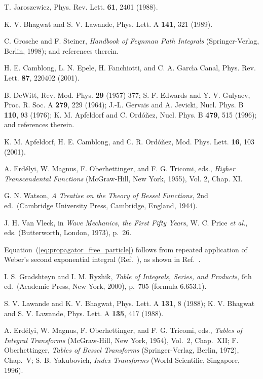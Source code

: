 \documentclass[a4paper,preprint,draft,showpacs,amsmath,amsfonts,amssymb,aps,prd]{revtex4}%
\begin{document}
\begin{thebibliography}{99}
T. Jaroszewicz, Phys. Rev. Lett.
{\bf 61}, 2401 (1988).

K. V. Bhagwat and S. V. Lawande,
Phys. Lett. A {\bf 141}, 321 (1989).

C. Grosche and F. Steiner,  %
{\it Handbook of Feynman Path Integrals\/}
(Springer-Verlag, Berlin, 1998);
and references therein.

H. E. Camblong, L. N. Epele, H. Fanchiotti, and C. A. Garc\'{\i}a
Canal, 
 Phys. Rev. Lett. {\bf 87}, 220402  (2001).

B. DeWitt, Rev. Mod. Phys.
{\bf 29} (1957) 377;
S. F. Edwards and Y. V. Gulyaev, 
Proc. R. Soc. A {\bf 279}, 229 (1964);
J.-L. Gervais and  A. Jevicki, 
Nucl. Phys. B {\bf 110}, 93 (1976); 
K. M. Apfeldorf
 and C. Ord\'o\~nez, 
Nucl. Phys. B {\bf 479}, 515 (1996);
and references therein.

K. M. Apfeldorf,
H. E. Camblong, and C. R. Ord\'{o}\~{n}ez,
Mod. Phys. Lett. {\bf 16}, 103 (2001).

A. Erd\'{e}lyi, W. Magnus, F. Oberhettinger, and F. G.
 Tricomi, eds.,
{\em Higher Transcendental Functions\/}
(McGraw-Hill, New York, 1955), Vol. 2, Chap. XI.

G. N. Watson, {\em A Treatise on the Theory of Bessel Functions\/},
2nd ed.\
(Cambridge University Press, Cambridge, England, 1944).

J. H. Van Vleck, in {\em Wave Mechanics, the First Fifty Years\/},
W. C. Price {\em et al.\/}, eds.
(Butterworth, London, 1973), p.\ 26.

Equation~(\ref{eq:propagator_free_particle})
follows from repeated application of Weber's second exponential integral
(Ref.~\cite{wat:44}), as shown in Ref.~\cite{pea:69}. 

I. S.  Gradshteyn and I. M. Ryzhik,
{\em Table of Integrals, Series, and Products\/},  6th ed.\
(Academic Press, New York, 2000), 
p.\ 705  (formula 6.653.1).

S. V. Lawande and K. V. Bhagwat,
Phys. Lett. A {\bf 131}, 8 (1988);
K. V. Bhagwat and S. V. Lawande,
Phys. Lett. A {\bf 135}, 417 (1988).

A. Erd\'{e}lyi, W. Magnus, F. Oberhettinger, and F. G.
 Tricomi, eds.,
{\em Tables of Integral Transforms\/}
(McGraw-Hill, New York, 1954), Vol.\ 2, Chap.\ XII;
F. Oberhettinger,
{\em Tables of Bessel Transforms\/}
(Springer-Verlag, Berlin, 1972),
Chap.\ V;
S. B. Yakubovich,
{\em Index Transforms\/}
(World Scientific, Singapore, 1996).


\end{thebibliography}
\end{document}
